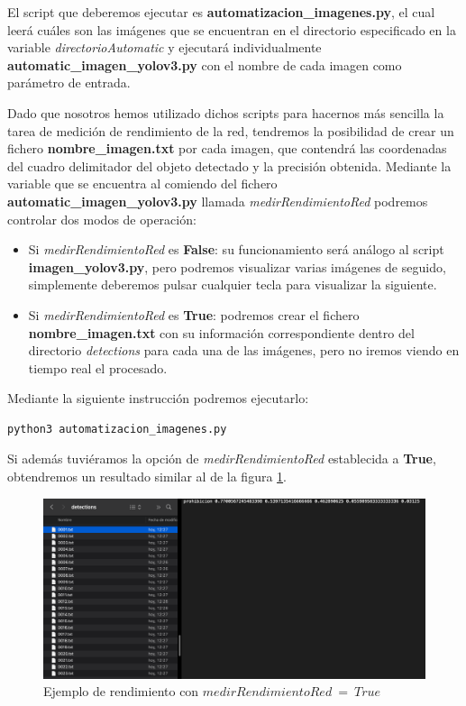 El script que deberemos ejecutar es \textbf{automatizacion_imagenes.py}, el cual leerá cuáles son las imágenes que se encuentran en el directorio especificado en la variable \textit{directorioAutomatic} y ejecutará individualmente \textbf{automatic_imagen_yolov3.py} con el nombre de cada imagen como parámetro de entrada.

Dado que nosotros hemos utilizado dichos scripts para hacernos más sencilla la tarea de medición de rendimiento de la red, tendremos la posibilidad de crear un fichero \textbf{nombre_imagen.txt} por cada imagen, que contendrá las coordenadas del cuadro delimitador del objeto detectado y la precisión obtenida. Mediante la variable que se encuentra al comiendo del fichero \textbf{automatic_imagen_yolov3.py} llamada \textit{medirRendimientoRed} podremos controlar dos modos de operación:

\begin{itemize}
\item Si \textit{medirRendimientoRed} es \textbf{False}: su funcionamiento será análogo al script \textbf{imagen_yolov3.py}, pero podremos visualizar varias imágenes de seguido, simplemente deberemos pulsar cualquier tecla para visualizar la siguiente. 

\item Si \textit{medirRendimientoRed} es \textbf{True}: podremos crear el fichero \textbf{nombre_imagen.txt} con su información correspondiente dentro del directorio \textit{detections} para cada una de las imágenes, pero no iremos viendo en tiempo real el procesado.
\end{itemize}

Mediante la siguiente instrucción podremos ejecutarlo:

\begin{lstlisting}
python3 automatizacion_imagenes.py
\end{lstlisting}

Si además tuviéramos la opción de \textit{medirRendimientoRed} establecida a \textbf{True}, obtendremos un resultado similar al de la figura \ref{detecc4}.

\begin{figure}[H]
	\centering
	\includegraphics[width=\textwidth]{Imagenes/AnexoI_Manual/AA/deteccion4.pdf}
	\caption{Ejemplo de rendimiento con $medirRendimientoRed \ =\ True$}
	\label{detecc4}
\end{figure}


